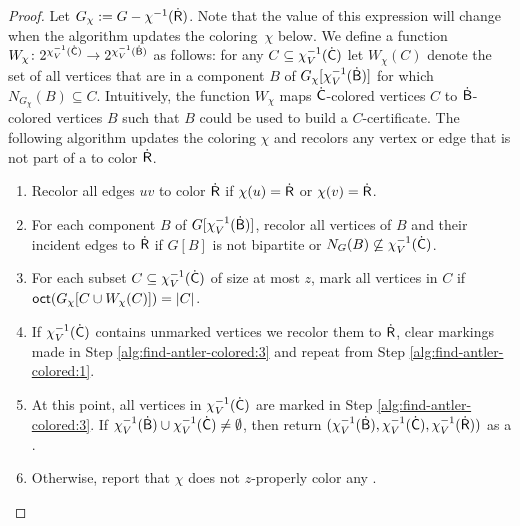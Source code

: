 \begin{proof}
  Let $G_\chi := G - \chi^{-1}(\mathsf{\dot{R}})$. Note that the value of this expression will change when the algorithm updates the coloring~$\chi$ below. 
  We define a function $W_\chi\colon 2^{\chi_V^{-1}(\mathsf{\dot{C}})} \to 2^{\chi_V^{-1}(\mathsf{\dot{B}})}$ as follows:
  for any $C \subseteq \chi_V^{-1}(\mathsf{\dot{C}})$ let $W_\chi(C)$ denote the set of all vertices that are in
  a component $B$ of $G_\chi[\chi_V^{-1}(\mathsf{\dot{B}})]$ for which $N_{G_\chi}(B) \subseteq C$.
  Intuitively, the function $W_\chi$ maps $\mathsf{\dot{C}}$-colored vertices $C$ to $\mathsf{\dot{B}}$-colored vertices $B$
  such that $B$ could be used to build a $C$-certificate.
  The following algorithm updates the coloring $\chi$ and recolors any vertex or edge
  that is not part of a \zocc to color $\mathsf{\dot{R}}$.

  \begin{enumerate}
      \item Recolor all edges $uv$ to color $\mathsf{\dot{R}}$ if $\chi(u)=\mathsf{\dot{R}}$ or $\chi(v)=\mathsf{\dot{R}}$.
          \label{alg:find-antler-colored:1}

      \item For each component $B$ of $G[\chi_V^{-1}(\mathsf{\dot{B}})]$,
          recolor all vertices of $B$ and their incident edges to $\mathsf{\dot{R}}$
          if $G[B]$ is not bipartite or $N_G(B) \not\subseteq \chi_V^{-1}(\mathsf{\dot{C}})$.
          \label{alg:find-antler-colored:2}

      \item For each subset $C \subseteq \chi_V^{-1}(\mathsf{\dot{C}})$ of size at most $z$,
          mark all vertices in $C$ if $\textnormal{\textsf{oct}}(G_\chi[C \cup W_\chi(C)]) = |C|$.
          \label{alg:find-antler-colored:3}

      \item If $\chi_V^{-1}(\mathsf{\dot{C}})$ contains unmarked vertices we recolor them to $\mathsf{\dot{R}}$,
          clear markings made in Step \ref{alg:find-antler-colored:3}
          and repeat from Step \ref{alg:find-antler-colored:1}.
          \label{alg:find-antler-colored:4}

      \item At this point, all vertices in $\chi_V^{-1}(\mathsf{\dot{C}})$ are marked in Step \ref{alg:find-antler-colored:3}.
          If $\chi_V^{-1}(\mathsf{\dot{B}}) \cup \chi_V^{-1}(\mathsf{\dot{C}}) \neq \emptyset$, then 
          return $(\chi_V^{-1}(\mathsf{\dot{B}}), \chi_V^{-1}(\mathsf{\dot{C}}), \chi_V^{-1}(\mathsf{\dot{R}}))$ as a \zocc.
          \label{alg:find-antler-colored:5}

      \item Otherwise, report that $\chi$ does not $z$-properly color any \zocc.
          \label{alg:find-antler-colored:6}
  \end{enumerate}


\end{proof}

